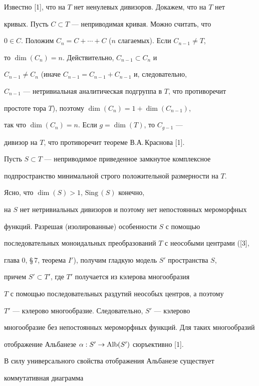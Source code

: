 \begin{pf}


Известно [1], что на $T$ нет ненулевых дивизоров. Докажем, что на $T$ нет


кривых. Пусть $C\subset T$ --- неприводимая кривая. Можно считать, что


$0\in C$. Положим $C_n=C+\dotsb+C$ ($n$ слагаемых). Если $C_{n-1}\neq T$,


то $\dim (C_n)=n$. Действительно, $C_{n-1}\subset C_n$ и


$C_{n-1}\neq C_n$ (иначе $C_{n-1}=C_{n-1}+C_{n-1}$ и, следовательно,


$C_{n-1}$ --- нетривиальная аналитическая подгруппа в $T$, что противоречит


простоте тора $T$), поэтому $\dim (C_n)=1+\dim (C_{n-1})$,


так что $\dim (C_n)=n$. Если $g=\dim (T)$, то $C_{g-1}$ ---


дивизор на $T$, что противоречит теореме В.А.\,Краснова [1].





Пусть $S\subset T$ --- неприводимое приведенное замкнутое комплексное


подпространство минимальной строго положительной размерности на $T$.


Ясно, что $\dim (S)>1$, $\text{Sing}\,(S)$ конечно,


на $S$ нет нетривиальных дивизоров и поэтому нет непостоянных мероморфных


функций. Разрешая (изолированные) особенности $S$ с помощью


последовательных моноидальных преобразований $T$ с неособыми центрами ([3],


глава 0, \S\,7, теорема $I'$), получим гладкую модель $S'$ пространства $S$,


причем $S'\subset T'$, где $T'$ получается из кэлерова многообразия


$T$ с помощью последовательных раздутий неособых центров, а поэтому


$T'$ --- кэлерово многообразие. Следовательно, $S'$ --- кэлерово


многообразие без непостоянных мероморфных функций. Для таких многообразий


отображение Альбанезе $\alpha:S'\to\operatorname{Alb} (S')$ сюръективно [1].


В силу универсального свойства отображения Альбанезе существует


коммутативная диаграмма



\end{pf}
